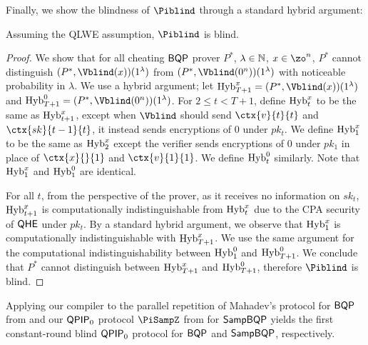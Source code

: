 Finally, we show the blindness of $\Piblind$ through a standard hybrid argument:
\begin{thm} \label{thm:compiler-blindness}
    Assuming the QLWE assumption, $\Piblind$ is blind.
\end{thm}
\begin{proof}
    We show that for all cheating $\operatorname{\mathsf{BQP}}$ prover $P^*$, $\lambda\in\mathbb{N}$, $x\in\zo^n$,
    $P^*$ cannot distinguish $(P^*, \Vblind(x))(1^\lambda)$ from $(P^*, \Vblind(0^n))(1^\lambda)$ with noticeable probability in $\lambda$.
    We use a hybrid argument; let $\Hyb_{T+1}^x=(P^*, \Vblind(x))(1^\lambda)$ and $\Hyb_{T+1}^0=(P^*, \Vblind(0^n))(1^\lambda)$.
    For $2\leq t<T+1$, define $\operatorname{Hyb}_t^x$ to be the same as $\operatorname{Hyb}_{t+1}^x$,
    except when $\Vblind$ should send $\ctx{v}{t}{t}$ and $\ctx{sk}{t-1}{t}$, it instead sends encryptions of $0$ under $pk_t$.
    We define $\operatorname{Hyb}_1^x$ to be the same as $\operatorname{Hyb}_2^x$ except the verifier sends encryptions of $0$ under $pk_1$ in place of $\ctx{x}{}{1}$ and $\ctx{v}{1}{1}$.
    We define $\operatorname{Hyb}_t^0$ similarly. Note that $\operatorname{Hyb}_1^x$ and $\operatorname{Hyb}_1^0$ are identical.

    For all $t$, from the perspective of the prover,
    as it receives no information on $sk_t$,
    $\operatorname{Hyb}_{t+1}^x$ is computationally indistinguishable from $\operatorname{Hyb}_t^x$ due to the CPA security of $\mathsf{QHE}$ under $pk_t$.
    By a standard hybrid argument, we observe that $\operatorname{Hyb}_1^x$ is computationally indistinguishable with $\operatorname{Hyb}_{T+1}^x$.
    We use the same argument for the computational indistinguishability between $\operatorname{Hyb}_1^0$ and $\operatorname{Hyb}_{T+1}^0$.
    We conclude that $P^*$ cannot distinguish between $\operatorname{Hyb}_{T+1}^x$ and $\operatorname{Hyb}_{T+1}^0$,
    therefore $\Piblind$ is blind.
\end{proof}

Applying our compiler to the parallel repetition of Mahadev's protocol for $\operatorname{\mathsf{BQP}}$ from \cite{arXiv:ChiaChungYam19, arXiv:AlaChiHun19} and our $\operatorname{\mathsf{QPIP}}_0$ protocol $\PiSampZ$ from  for $\operatorname{\mathsf{SampBQP}}$ yields the first constant-round blind $\operatorname{\mathsf{QPIP}}_0$ protocol for $\operatorname{\mathsf{BQP}}$ and $\operatorname{\mathsf{SampBQP}}$, respectively.



